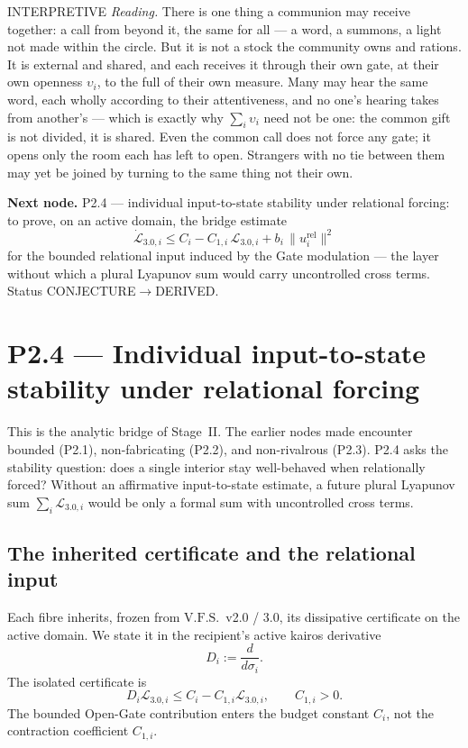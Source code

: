 \documentclass[11pt,a4paper]{article}
\newcommand{\VFS}{\ensuremath{\mathrm{V.F.S.}}}
\newcommand{\stDerived}{\textcolor{cDer}{\textsf{\small DERIVED}}}
\newcommand{\stInterp}{\textcolor{cInt}{\textsf{\small INTERPRETIVE}}}
\newcommand{\stConj}{\textcolor{cCon}{\textsf{\small CONJECTURE}}}
\theoremstyle{definition}
\theoremstyle{plain}
\theoremstyle{remark}
\begin{document}
\medskip
\stInterp\quad
\emph{Reading.}
There is one thing a communion may receive together: a call from beyond it, the same for
all --- a word, a summons, a light not made within the circle. But it is not a stock the
community owns and rations. It is external and shared, and each receives it through their own
gate, at their own openness \(\upsilon_i\), to the full of their own measure. Many may hear the
same word, each wholly according to their attentiveness, and no one's hearing takes from
another's --- which is exactly why \(\sum_i \upsilon_i\) need not be one: the common gift is not
divided, it is shared. Even the common call does not force any gate; it opens only the room
each has left to open. Strangers with no tie between them may yet be joined by turning to the
same thing not their own.

\medskip
\textbf{Next node.} P2.4 --- individual input-to-state stability under relational forcing:
to prove, on an active domain, the bridge estimate
\[
\dot{\mathcal L}_{3.0,i}\le C_i-C_{1,i}\,\mathcal L_{3.0,i}+b_i\,\lVert u^{\mathrm{rel}}_i\rVert^2
\]
for the bounded relational input induced by the Gate modulation --- the layer without which
a plural Lyapunov sum would carry uncontrolled cross terms. Status \stConj\(\to\)\stDerived.

\section{P2.4 --- Individual input-to-state stability under relational forcing}

This is the analytic bridge of Stage~II. The earlier nodes made encounter bounded
(P2.1), non-fabricating (P2.2), and non-rivalrous (P2.3). P2.4 asks the stability
question: does a single interior stay well-behaved when relationally forced? Without an
affirmative input-to-state estimate, a future plural Lyapunov sum
\(\sum_i\mathcal L_{3.0,i}\) would be only a formal sum with uncontrolled cross terms.

\subsection{The inherited certificate and the relational input}

Each fibre inherits, frozen from \VFS\ v2.0 / 3.0, its dissipative certificate on
the active domain. We state it in the recipient's active kairos derivative
\[
D_i:=\frac{d}{d\sigma_i}.
\]
The isolated certificate is
\[
D_i\mathcal L_{3.0,i}
\le
C_i-C_{1,i}\mathcal L_{3.0,i},
\qquad
C_{1,i}>0.
\tag{H1}
\]
The bounded Open-Gate contribution enters the budget constant \(C_i\), not the
contraction coefficient \(C_{1,i}\).
\end{document}
